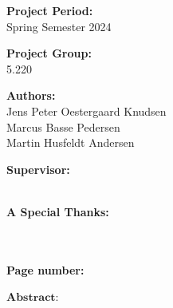 \begin{titlepage}
\begin{minipage}[t]{0.48\textwidth}

\textbf{Project Period:} \\[5pt] \hspace*{2ex}
\hspace*{-13pt}Spring Semester 2024 \\\hspace*{2ex}

\textbf{Project Group:} \\[5pt]\bigskip\hspace{2ex}
\hspace*{-13pt}5.220	

\textbf{Authors:} \\[5pt]\hspace*{2ex}\hspace*{-13pt}
Jens Peter Oestergaard Knudsen \\ \hspace*{2ex}
\hspace*{-13pt}Marcus Basse Pedersen \\\hspace*{2ex}
\hspace*{-13pt}Martin Husfeldt Andersen \\\hspace*{2ex}
\space 

\textbf{Supervisor:} \\[5pt]\hspace*{2ex}\hspace*{-13pt} 
 \hspace*{-13pt}
 \\\hspace*{2ex}
 
 \textbf{A Special Thanks:} \\[5pt]\hspace*{2ex}\hspace*{-13pt}

 \hspace*{-13pt}
 \\\hspace*{2ex}\\
\textbf{Page number: \pageref{LastPage}
} \\ 


\end{minipage}
\hfill
\begin{minipage}[t]{0.483\textwidth}

$\textbf{Abstract:}$ \\[5pt]
\fbox{\parbox{7cm}{}}
\end{minipage}

\vfill

\end{titlepage}
